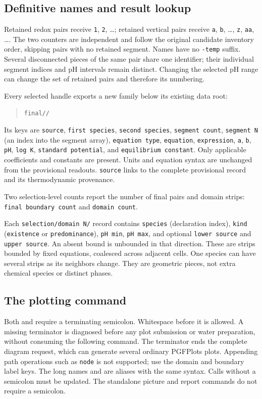 \documentclass[a4paper,11pt]{ltxdoc}
\begin{document}
\subsection{Definitive names and result lookup}
Retained redox pairs receive \texttt{1}, \texttt{2}, \ldots; retained vertical pairs
receive \texttt{a}, \texttt{b}, \ldots, \texttt{z}, \texttt{aa}, \ldots.
The two counters are independent and follow the original candidate inventory
order, skipping pairs with no retained segment. Names have no \texttt{-temp}
suffix. Several disconnected pieces of the same pair share one identifier;
their individual segment indices and pH intervals remain distinct. Changing the
selected pH range can change the set of retained pairs and therefore its numbering.

Every selected handle exports a new family below its existing data root:
\begin{quote}
\texttt{final/}\texttt{/}
\end{quote}
Its keys are \texttt{source}, \texttt{first species}, \texttt{second species},
\texttt{segment count}, \texttt{segment N} (an index into the segment array),
\texttt{equation type}, \texttt{equation}, \texttt{expression},
\texttt{a}, \texttt{b}, \texttt{pH}, \texttt{log K},
\texttt{standard potential}, and \texttt{equilibrium constant}.
Only applicable coefficients and constants are present. Units and equation
syntax are unchanged from the provisional readouts. \texttt{source} links to
the complete provisional record and its thermodynamic provenance.

Two selection-level counts report the number of final pairs and domain strips:
\texttt{final boundary count} and \texttt{domain count}.

Each \texttt{selection/domain N/} record contains
\texttt{species} (declaration index), \texttt{kind} (\texttt{existence} or
\texttt{predominance}), \texttt{pH min}, \texttt{pH max}, and optional
\texttt{lower source} and \texttt{upper source}. An absent bound is unbounded
in that direction. These are strips bounded by fixed equations, coalesced across
adjacent cells. One species can have several strips as its neighbors change.
They are geometric pieces, not extra chemical species or distinct phases.

\subsection{The plotting command}
Both  and  require a terminating semicolon.
Whitespace before it is allowed. A missing terminator is diagnosed before any
plot submission or water preparation, without consuming the following command.
The terminator ends the complete diagram request, which can generate several
ordinary PGFPlots plots. Appending path operations such as \texttt{node} is not
supported; use the domain and boundary label keys.
The long names  and  are
aliases with the same syntax. Calls without a semicolon must be updated.
The standalone picture and report commands do not require a semicolon.
\end{document}

